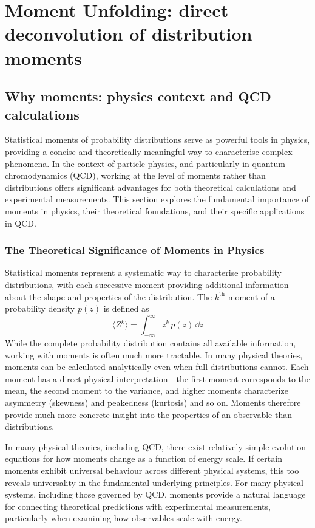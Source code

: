 \chapter{Moment Unfolding: direct deconvolution of distribution moments}
\label{chap:moment-unfolding}
\section{Why moments: physics context and QCD calculations}
    Statistical moments of probability distributions serve as powerful tools in physics, providing a concise and theoretically meaningful way to characterise complex phenomena.
    In the context of particle physics, and particularly in quantum chromodynamics (QCD), working at the level of moments rather than distributions offers significant advantages for both theoretical calculations and experimental measurements.
    This section explores the fundamental importance of moments in physics, their theoretical foundations, and their specific applications in QCD.
    \subsection{The Theoretical Significance of Moments in Physics}
        Statistical moments represent a systematic way to characterise probability distributions, with each successive moment providing additional information about the shape and properties of the distribution.
        The $k^{\text{th}}$ moment of a probability density $p(z)$ is defined as
        \[
            \langle Z^k \rangle = \int_{-\infty}^{\infty} z^k\, p(z)\, \dd z
        \]
        While the complete probability distribution contains all available information, working with moments is often much more tractable.
        In many physical theories, moments can be calculated analytically even when full distributions cannot.
        Each moment has a direct physical interpretation---the first moment corresponds to the mean, the second moment to the variance, and higher moments characterize asymmetry (skewness) and peakedness (kurtosis) and so on.
        Moments therefore provide much more concrete insight into the properties of an observable than distributions.
        
        In many physical theories, including QCD, there exist relatively simple evolution equations for how moments change as a function of energy scale.
        If certain moments exhibit universal behaviour across different physical systems, this too reveals universality in the fundamental underlying principles.
        For many physical systems, including those governed by QCD, moments provide a natural language for connecting theoretical predictions with experimental measurements, particularly when examining how observables scale with energy.
